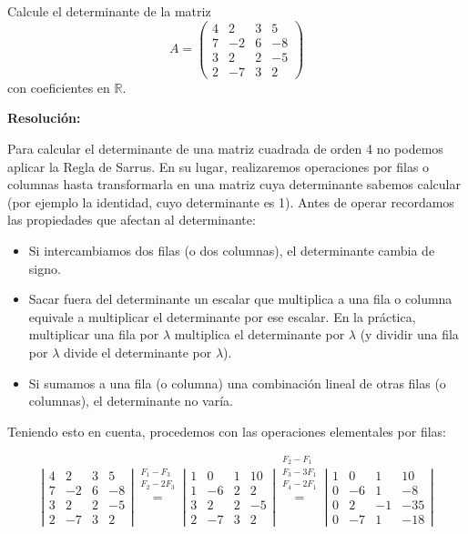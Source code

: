 \documentclass[a4paper,12pt]{article}
\begin{document}
\begin{ejercicio}[title=Ejercicio 32]
Calcule el determinante de la matriz
\[
A =
\begin{pmatrix}
4 & 2 & 3 & 5\\
7 & -2 & 6 & -8\\
3 & 2 & 2 & -5\\
2 & -7 & 3 & 2
\end{pmatrix}
\]
con coeficientes en $\mathbb{R}$.

\tcblower
\textbf{Resolución:}

Para calcular el determinante de una matriz cuadrada de orden 4 no podemos aplicar la Regla de Sarrus. En su lugar, realizaremos operaciones por filas o columnas hasta transformarla en una matriz cuya determinante sabemos calcular (por ejemplo la identidad, cuyo determinante es 1). Antes de operar recordamos las propiedades que afectan al determinante:

\begin{itemize}
\item Si intercambiamos dos filas (o dos columnas), el determinante cambia de signo.
\item Sacar fuera del determinante un escalar que multiplica a una fila o columna equivale a multiplicar el determinante por ese escalar. En la práctica, multiplicar una fila por $\lambda$ multiplica el determinante por $\lambda$ (y dividir una fila por $\lambda$ divide el determinante por $\lambda$).
\item Si sumamos a una fila (o columna) una combinación lineal de otras filas (o columnas), el determinante no varía.
\end{itemize}

Teniendo esto en cuenta, procedemos con las operaciones elementales por filas:

\[
\left|
\begin{matrix}
4 & 2 & 3 & 5\\
7 & -2 & 6 & -8\\
3 & 2 & 2 & -5\\
2 & -7 & 3 & 2
\end{matrix}
\right|
\overset{\substack{F_1-F_3\\F_2-2F_3\\{}}}{=}
\left|
\begin{matrix}
1 & 0 & 1 & 10\\
1 & -6 & 2 & 2\\
3 & 2 & 2 & -5\\
2 & -7 & 3 & 2
\end{matrix}
\right|
\overset{\substack{F_2-F_1\\F_3-3F_1\\F_4-2F_1\\{}}}{=}
\left|
\begin{matrix}
1 & 0 & 1 & 10\\
0 & -6 & 1 & -8\\
0 & 2 & -1 & -35\\
0 & -7 & 1 & -18
\end{matrix}
\right|
\]


\end{ejercicio}
\end{document}
